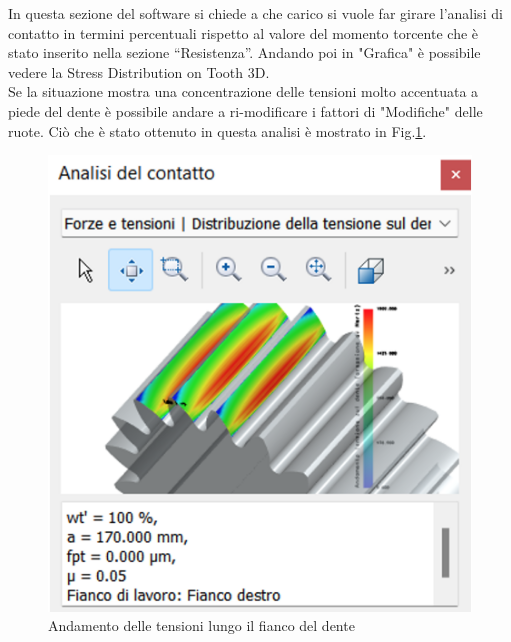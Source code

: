 In questa sezione del software si chiede a che carico si vuole far girare l’analisi di contatto in termini percentuali rispetto al valore del momento torcente che è stato inserito nella sezione “Resistenza”. Andando poi in "Grafica" è possibile vedere la Stress Distribution on Tooth 3D. \\
Se la situazione mostra una concentrazione delle tensioni molto accentuata a piede del dente è possibile andare a ri-modificare i fattori di "Modifiche" delle ruote.
\newpage
Ciò che è stato ottenuto in questa analisi è mostrato in Fig.\ref{fig:StressDistributionCoppia45}.
\begin{figure}[h]
    \centering
    \includegraphics[scale=0.4]{Immagini/StressDistributionCoppia45.png}
    \caption{Andamento delle tensioni lungo il fianco del dente}
    \label{fig:StressDistributionCoppia45}
\end{figure}

